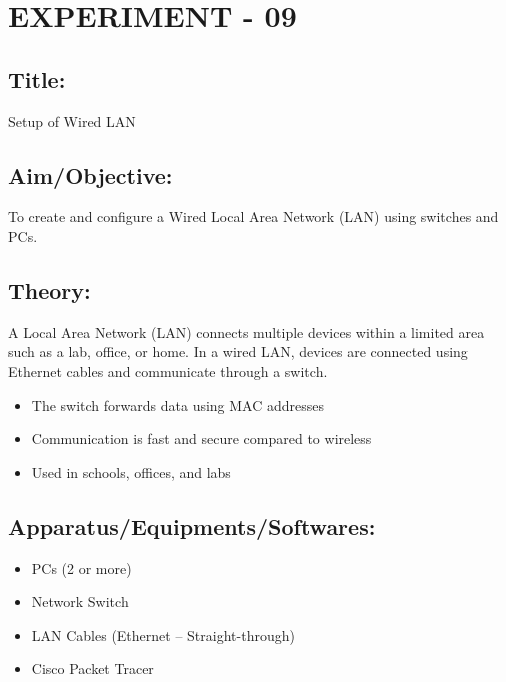 \documentclass[a4paper,10pt]{article}
\begin{document}
\newpage
\section{EXPERIMENT - 09}
\subsection{Title:}
Setup of Wired LAN

\subsection{Aim/Objective:}
To create and configure a Wired Local Area Network (LAN) using switches and PCs.

\subsection{Theory:}
A Local Area Network (LAN) connects multiple devices within a limited area such as a lab, office, or home. In a wired LAN, devices are connected using Ethernet cables and communicate through a switch.
\begin{itemize}
    \item The switch forwards data using MAC addresses
    \item Communication is fast and secure compared to wireless
    \item Used in schools, offices, and labs
\end{itemize}
    
\subsection{Apparatus/Equipments/Softwares:}
\begin{itemize}
    \item PCs (2 or more)
    \item Network Switch
    \item LAN Cables (Ethernet – Straight-through)
    \item Cisco Packet Tracer
\end{itemize}
\end{document}
